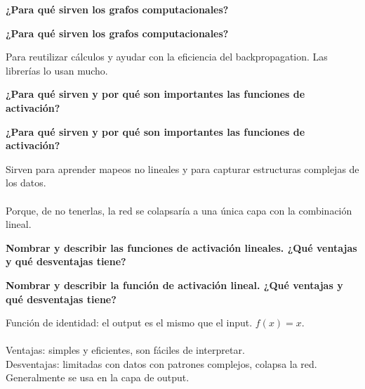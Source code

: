 \documentclass[10pt]{memoir}
\begin{document}
    \clearpage
    \begin{center}
        \textbf{\Large ¿Para qué sirven los grafos computacionales?} \\
    \end{center}

    \clearpage
    \begin{center}
        \textbf{\Large ¿Para qué sirven los grafos computacionales?} \\
    \end{center}
    Para reutilizar cálculos y ayudar con la eficiencia del backpropagation. Las librerías lo usan mucho. 

    \clearpage
    \begin{center}
        \textbf{\Large ¿Para qué sirven y por qué son importantes las funciones de activación?} \\
    \end{center}

    \clearpage
    \begin{center}
        \textbf{\Large ¿Para qué sirven y por qué son importantes las funciones de activación?} \\
    \end{center}
        Sirven para aprender mapeos no lineales y para capturar estructuras complejas de los datos. \\
        \\
        Porque, de no tenerlas, la red se colapsaría a una única capa con la combinación lineal.

    \clearpage
    \begin{center}
        \textbf{\Large Nombrar y describir las funciones de activación lineales. ¿Qué ventajas y qué desventajas tiene?} \\
    \end{center}

    \clearpage
    \begin{center}
        \textbf{\Large Nombrar y describir la función de activación lineal. ¿Qué ventajas y qué desventajas tiene?} \\
    \end{center}
        Función de identidad: el output es el mismo que el input. \(f(x) = x\). \\
        \\
        Ventajas: simples y eficientes, son fáciles de interpretar. \\
        Desventajas: limitadas con datos con patrones complejos, colapsa la red. Generalmente se usa en la capa de output.
\end{document}
